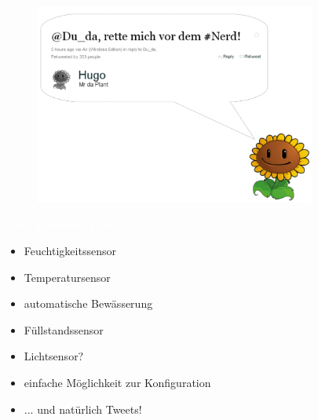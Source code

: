 \documentclass[bigger]{beamer}
\newcommand{\topic}[1]{{\huge{\textcolor{white}{\textbf{#1}}}}}
\begin{document}
{
%
\begin{frame}
\begin{figure}[H]
\includegraphics[width=350px]{SprechblaseOR.png}
\end{figure}

\end{frame}
}

\begin{frame}{\topic{The "planned" guard}}
	\begin{itemize}
		\item Feuchtigkeitssensor
		\item Temperatursensor
		\item automatische Bewässerung
		\item Füllstandssensor
		\item Lichtsensor?
		\item einfache Möglichkeit zur Konfiguration
		\item ... und natürlich Tweets!
	\end{itemize}
\end{frame}
\end{document}
